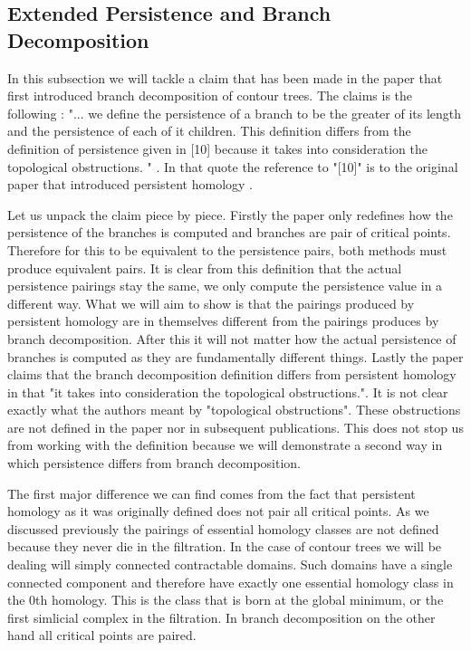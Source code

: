 \subsection{Extended Persistence and Branch Decomposition}

In this subsection we will tackle a claim that has been made in the paper that first introduced branch decomposition of contour trees. The claims is the following : "... we define the persistence of a branch to be the greater of its length and the persistence of each of it children. This definition differs from the definition of persistence given in [10] because it takes into consideration the topological obstructions. " \cite{ct-branch-decomp}. In that quote the reference to "[10]" is to the original paper that introduced persistent homology \cite{persistence-original}.

Let us unpack the claim piece by piece. Firstly the paper only redefines how the persistence of the branches is computed and branches are pair of critical points. Therefore for this to be equivalent to the persistence pairs, both methods must  produce equivalent pairs. It is clear from this definition that the actual persistence pairings stay the same, we only compute the persistence value in a different way. What we will aim to show is that the pairings produced by persistent homology are in themselves different from the pairings produces by branch decomposition. After this it will not matter how the actual persistence of branches is computed as they are fundamentally different things. Lastly the paper claims that the branch decomposition definition differs from persistent homology in that "it takes into consideration the topological obstructions.". It is not clear exactly what the authors meant by "topological obstructions". These obstructions are not defined in the paper nor in subsequent publications. This does not stop us from working with the definition because we will demonstrate a second way in which persistence differs from branch decomposition.

The first major difference we can find comes from the fact that persistent homology as it was originally defined does not pair all critical points. As we discussed previously the pairings of essential homology classes are not defined because they never die in the filtration. In the case of contour trees we will be dealing will simply connected contractable domains. Such domains have a single connected component and therefore have exactly one essential homology class in the 0th homology. This is the class that is born at the global minimum, or the first simlicial complex in the filtration. In branch decomposition on the other hand all critical points are paired.

